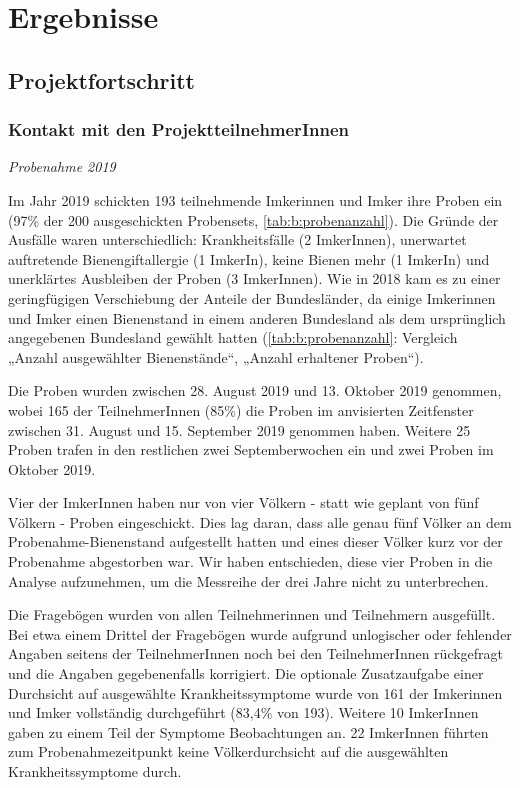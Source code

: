 \section{Ergebnisse}

\subsection{Projektfortschritt}
\subsubsection{Kontakt mit den ProjektteilnehmerInnen}

\textit{Probenahme 2019}

Im Jahr 2019 schickten 193 teilnehmende Imkerinnen und Imker ihre Proben ein (97\% der 200 ausgeschickten Probensets, \cref{tab:b:probenanzahl}). Die Gründe der Ausfälle waren unterschiedlich: Krankheitsfälle (2 ImkerInnen), unerwartet auftretende Bienengiftallergie (1 ImkerIn), keine Bienen mehr (1 ImkerIn) und unerklärtes Ausbleiben der Proben (3 ImkerInnen). Wie in 2018 kam es zu einer geringfügigen Verschiebung der Anteile der Bundesländer, da einige Imkerinnen und Imker einen Bienenstand in einem anderen Bundesland als dem ursprünglich angegebenen Bundesland gewählt hatten (\cref{tab:b:probenanzahl}: Vergleich „Anzahl ausgewählter Bienenstände“, „Anzahl erhaltener Proben“).

Die Proben wurden zwischen 28. August 2019 und 13. Oktober 2019 genommen, wobei 165 der TeilnehmerInnen (85\%) die Proben im anvisierten Zeitfenster zwischen 31. August und 15. September 2019 genommen haben. Weitere 25 Proben trafen in den restlichen zwei Septemberwochen ein und zwei Proben im Oktober 2019.

Vier der ImkerInnen haben nur von vier Völkern - statt wie geplant von fünf Völkern - Proben eingeschickt. Dies lag daran, dass alle genau fünf Völker an dem Probenahme-Bienenstand aufgestellt hatten und eines dieser Völker kurz vor der Probenahme abgestorben war. Wir haben entschieden, diese vier Proben in die Analyse aufzunehmen, um die Messreihe der drei Jahre nicht zu unterbrechen.

Die Fragebögen wurden von allen Teilnehmerinnen und Teilnehmern ausgefüllt. Bei etwa einem Drittel der Fragebögen wurde aufgrund unlogischer oder fehlender Angaben seitens der TeilnehmerInnen noch bei den TeilnehmerInnen rückgefragt und die Angaben gegebenenfalls korrigiert. Die optionale Zusatzaufgabe einer Durchsicht auf ausgewählte Krankheitssymptome wurde von 161 der Imkerinnen und Imker vollständig durchgeführt (83,4\% von 193). Weitere 10 ImkerInnen gaben zu einem Teil der Symptome Beobachtungen an. 22 ImkerInnen führten zum Probenahmezeitpunkt keine Völkerdurchsicht auf die ausgewählten Krankheitssymptome durch.

